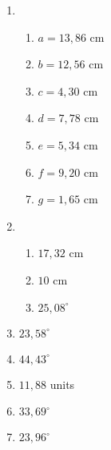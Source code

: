 {\begin{multicols}{3}
\begin{enumerate}[noitemsep, label=\textbf{\arabic*}. ]
\item %

    \begin{enumerate}[noitemsep, label=\textbf{(\alph*)} ]
\item$a=13,86$ cm
\item$b=12,56$ cm
\item$c=4,30$ cm
\item$d=7,78$ cm
\item$e=5,34$ cm
\item$f=9,20$ cm
\item$g=1,65$ cm
      \end{enumerate}
\item %
\begin{enumerate}[noitemsep, label=\textbf{(\alph*)} ]
\item $17,32$ cm%
\item $10$ cm%
\item $25,08^{\circ}$%
\end{enumerate} 
\item $23,58^{\circ}$%
\item $44,43^{\circ}$%

\item $11,88$ units%
 
\item $33,69^{\circ}$%
\item $23,96^{\circ}$%



\end{enumerate}
\end{multicols}}
